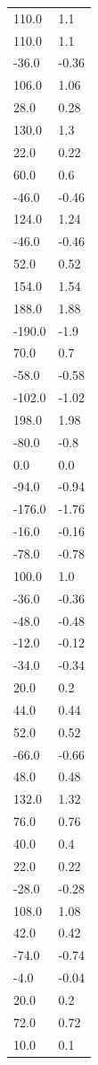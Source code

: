 \begin{longtable}{ll}
110.0 & 1.1 \\
110.0 & 1.1 \\
-36.0 & -0.36 \\
106.0 & 1.06 \\
28.0 & 0.28 \\
130.0 & 1.3 \\
22.0 & 0.22 \\
60.0 & 0.6 \\
-46.0 & -0.46 \\
124.0 & 1.24 \\
-46.0 & -0.46 \\
52.0 & 0.52 \\
154.0 & 1.54 \\
188.0 & 1.88 \\
-190.0 & -1.9 \\
70.0 & 0.7 \\
-58.0 & -0.58 \\
-102.0 & -1.02 \\
198.0 & 1.98 \\
-80.0 & -0.8 \\
0.0 & 0.0 \\
-94.0 & -0.94 \\
-176.0 & -1.76 \\
-16.0 & -0.16 \\
-78.0 & -0.78 \\
100.0 & 1.0 \\
-36.0 & -0.36 \\
-48.0 & -0.48 \\
-12.0 & -0.12 \\
-34.0 & -0.34 \\
20.0 & 0.2 \\
44.0 & 0.44 \\
52.0 & 0.52 \\
-66.0 & -0.66 \\
48.0 & 0.48 \\
132.0 & 1.32 \\
76.0 & 0.76 \\
40.0 & 0.4 \\
22.0 & 0.22 \\
-28.0 & -0.28 \\
108.0 & 1.08 \\
42.0 & 0.42 \\
-74.0 & -0.74 \\
-4.0 & -0.04 \\
20.0 & 0.2 \\
72.0 & 0.72 \\
10.0 & 0.1 \\

\end{longtable}

